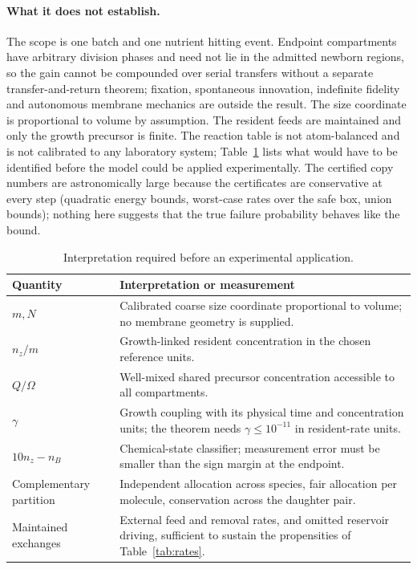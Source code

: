 \documentclass[11pt,a4paper]{article}
\theoremstyle{plain}
\theoremstyle{definition}
\theoremstyle{remark}
\begin{document}
\paragraph{What it does not establish.}
The scope is one batch and one nutrient hitting event. Endpoint compartments have arbitrary division phases and need not lie in the admitted newborn regions, so the gain cannot be compounded over serial transfers without a separate transfer-and-return theorem; fixation, spontaneous innovation, indefinite fidelity and autonomous membrane mechanics are outside the result. The size coordinate is proportional to volume by assumption. The resident feeds are maintained and only the growth precursor is finite. The reaction table is not atom-balanced and is not calibrated to any laboratory system; Table~\ref{tab:interpret} lists what would have to be identified before the model could be applied experimentally. The certified copy numbers are astronomically large because the certificates are conservative at every step (quadratic energy bounds, worst-case rates over the safe box, union bounds); nothing here suggests that the true failure probability behaves like the bound.

\begin{table}[ht]
\centering\small
\caption{Interpretation required before an experimental application.}
\label{tab:interpret}
\begin{tabular}{>{\raggedright\arraybackslash}p{.24\linewidth}>{\raggedright\arraybackslash}p{.68\linewidth}}
\toprule
Quantity & Interpretation or measurement\\
\midrule
$m,N$ & Calibrated coarse size coordinate proportional to volume; no membrane geometry is supplied.\\
$n_z/m$ & Growth-linked resident concentration in the chosen reference units.\\
$Q/\Omega$ & Well-mixed shared precursor concentration accessible to all compartments.\\
$\gamma$ & Growth coupling with its physical time and concentration units; the theorem needs $\gamma\leq10^{-11}$ in resident-rate units.\\
$10n_z-n_B$ & Chemical-state classifier; measurement error must be smaller than the sign margin at the endpoint.\\
Complementary partition & Independent allocation across species, fair allocation per molecule, conservation across the daughter pair.\\
Maintained exchanges & External feed and removal rates, and omitted reservoir driving, sufficient to sustain the propensities of Table~\ref{tab:rates}.\\
\bottomrule
\end{tabular}
\end{table}
\end{document}
